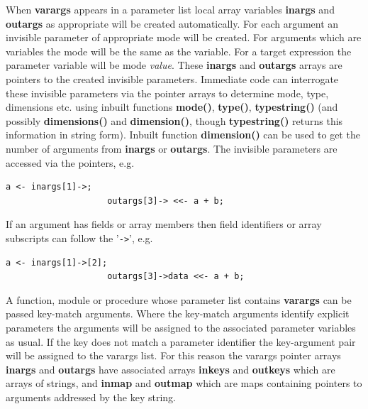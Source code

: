                 When {\bf varargs} appears in a parameter list
                local array variables {\bf inargs} and {\bf outargs} as
                appropriate will be created automatically. For each argument an
                invisible parameter of appropriate mode will be created. For
                arguments which are variables the mode will be the same as the
                variable. For a target expression the parameter variable will
                be mode {\em value}. These {\bf inargs} and {\bf outargs} arrays are
                pointers to the created invisible parameters. Immediate code
                can interrogate these invisible parameters via the pointer
                arrays to determine mode, type, dimensions etc. using inbuilt
                functions {\bf mode()}, {\bf type()}, {\bf typestring()}
                (and possibly {\bf dimensions()} and {\bf dimension()}, though
                {\bf typestring()} returns this information in string form).
                Inbuilt function {\bf dimension()} can be used to get the
                number of arguments from {\bf inargs} or {\bf outargs}. The
                invisible parameters are accessed via the pointers, e.g.
                \begin{lstlisting}[gobble=16, language=threepl]
                    a <- inargs[1]->;
                    outargs[3]-> <<- a + b;
                \end{lstlisting}
                If an argument has fields or array members then field
                identifiers or array subscripts can follow the '\verb'->'',
                e.g.
                \begin{lstlisting}[gobble=16, language=threepl]
                    a <- inargs[1]->[2];
                    outargs[3]->data <<- a + b;
                \end{lstlisting}
                
                A function, module or procedure whose parameter list
                contains {\bf varargs} can be passed key-match arguments.
                Where the key-match arguments identify explicit parameters
                the arguments will be assigned to the associated parameter
                variables as usual. If the key does not match a parameter
                identifier the key-argument pair will be assigned to the
                varargs list. For this reason the varargs pointer arrays
                {\bf inargs} and {\bf outargs} have associated arrays
                {\bf inkeys} and {\bf outkeys} which are arrays of strings,
                and {\bf inmap} and {\bf outmap} which are maps containing
                pointers to arguments addressed by the key string.
                

